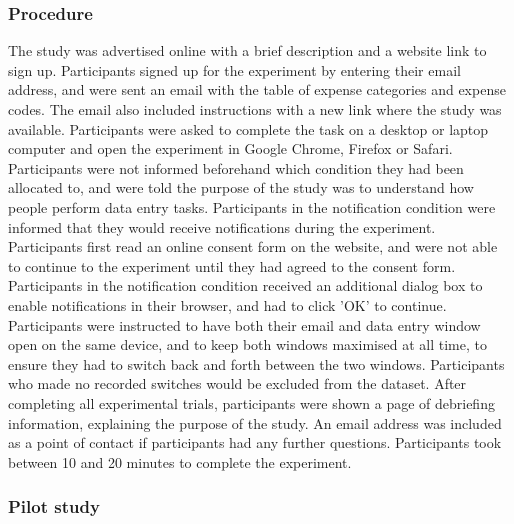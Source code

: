 \subsubsection{Procedure}
The study was advertised online with a brief description and a website link to sign up. Participants signed up for the experiment by entering their email address, and were sent an email with the table of expense categories and expense codes. The email also included instructions with a new link where the study was available. Participants were asked to complete the task on a desktop or laptop computer and open the experiment in Google Chrome, Firefox or Safari. Participants were not informed beforehand which condition they had been allocated to, and were told the purpose of the study was to understand how people perform data entry tasks. Participants in the notification condition were informed that they would receive notifications during the experiment. 
Participants first read an online consent form on the website, and were not able to continue to the experiment until they had agreed to the consent form. Participants in the notification condition received an additional dialog box to enable notifications in their browser, and had to click 'OK' to continue. Participants were instructed to have both their email and data entry window open on the same device, and to keep both windows maximised at all time, to ensure they had to switch back and forth between the two windows. Participants who made no recorded switches would be excluded from the dataset. 
After completing all experimental trials, participants were shown a page of debriefing information, explaining the purpose of the study. An email address was included as a point of contact if participants had any further questions. Participants took between 10 and 20 minutes to complete the experiment.

\subsubsection{Pilot study}

